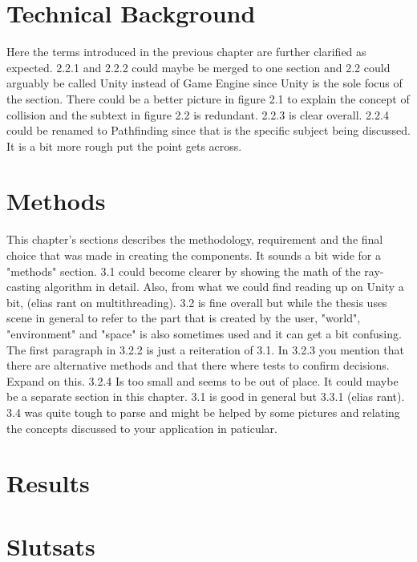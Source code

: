 \documentclass[12pt,a4paper,twoside,openright]{report}
\begin{document}
\section*{Technical Background}

Here the terms introduced in the previous chapter are further clarified as
expected. 2.2.1 and 2.2.2 could maybe be merged to one section and 2.2 could
arguably be called Unity instead of Game Engine since Unity is the sole focus
of the section. There could be a better picture in figure 2.1 to explain the
concept of collision and the subtext in figure 2.2 is redundant. 2.2.3 is clear
overall. 2.2.4 could be renamed to Pathfinding since that is the specific
subject being discussed. It is a bit more rough put the point gets across.

\section*{Methods}

This chapter's sections describes the methodology, requirement and the final
choice that was made in creating the components. It sounds a bit wide for a
"methods" section. 3.1 could become clearer by showing the math of the
ray-casting algorithm in detail. Also, from what we could find reading up on
Unity a bit, (elias rant on multithreading). 3.2 is fine overall but while the
thesis uses scene in general to refer to the part that is created by the user,
"world", "environment" and "space" is also sometimes used and it can get a bit
confusing. The first paragraph in 3.2.2 is just a reiteration of 3.1. In 3.2.3
you mention that there are alternative methods and that there where tests to
confirm decisions. Expand on this. 3.2.4 Is too small and seems to be out of
place. It could maybe be a separate section in this chapter. 3.1 is good in
general but 3.3.1 (elias rant). 3.4 was quite tough to parse and might be
helped by some pictures and relating the concepts discussed to your application
in paticular.

\section*{Results}


\section*{Slutsats}
\end{document}
